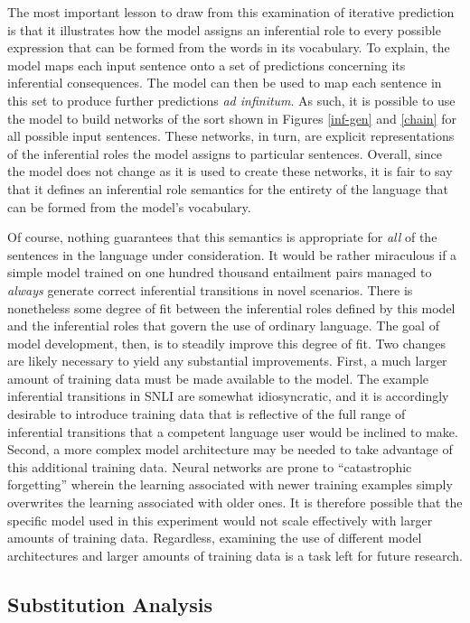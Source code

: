 The most important lesson to draw from this examination of iterative prediction is that it illustrates how the model assigns an inferential role to every possible expression that can be formed from the words in its vocabulary. To explain, the model maps each input sentence onto a set of predictions concerning its inferential consequences. The model can then be used to map each sentence in this set to produce further predictions \textit{ad infinitum}. As such, it is possible to use the model to build networks of the sort shown in Figures \ref{inf-gen} and \ref{chain} for all possible input sentences. These networks, in turn, are explicit representations of the inferential roles the model assigns to particular sentences. Overall, since the model does not change as it is used to create these networks, it is fair to say that it defines an inferential role semantics for the entirety of the language that can be formed from the model's vocabulary. 

Of course, nothing guarantees that this semantics is appropriate for \textit{all} of the sentences in the language under consideration. It would be rather miraculous if a simple model trained on one hundred thousand entailment pairs managed to \textit{always} generate correct inferential transitions in novel scenarios. There is nonetheless some degree of fit between the inferential roles defined by this model and the inferential roles that govern the use of ordinary language. The goal of model development, then, is to steadily improve this degree of fit. Two changes are likely necessary to yield any substantial improvements. First, a much larger amount of training data must be made available to the model. The example inferential transitions in SNLI are somewhat idiosyncratic, and it is accordingly desirable to introduce training data that is reflective of the full range of inferential transitions that a competent language user would be inclined to make. Second, a more complex model architecture may be needed to take advantage of this additional training data. Neural networks are prone to ``catastrophic forgetting'' wherein the learning associated with newer training examples simply overwrites the learning associated with older ones. It is therefore possible that the specific model used in this experiment would not scale effectively with larger amounts of training data. Regardless, examining the use of different model architectures and larger amounts of training data is a task left for future research.

\subsection{Substitution Analysis}

